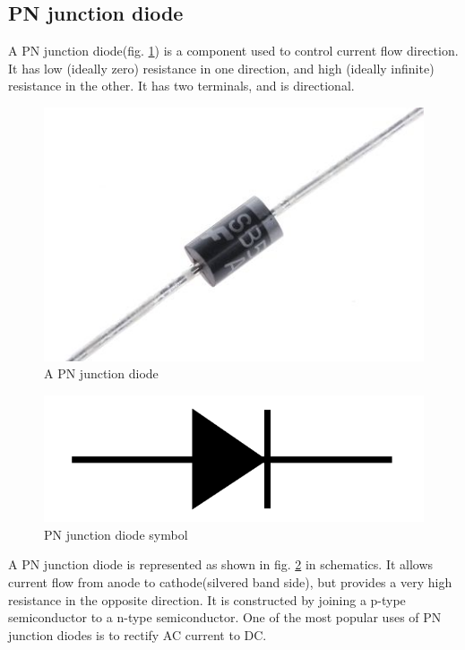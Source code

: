\documentclass{article}
\begin{document}
\subsection{PN junction diode}
A PN junction diode(fig. \ref{fig:diode}) is a component used to control current flow direction. It has low (ideally zero) resistance in one direction, and high (ideally infinite) resistance in the other. It has two terminals, and is directional. \\
\begin{figure}[h!]
	\centering
	\includegraphics[width=0.6\linewidth]{diode}
	\caption{A PN junction diode}
	\label{fig:diode}
\end{figure}
\begin{figure}[h]
	\centering
	\includegraphics[width=0.1\linewidth]{diode_symbol}
	\caption{PN junction diode symbol}
	\label{fig:diodesymbol}
\end{figure}
A PN junction diode is represented as shown in fig. \ref{fig:diodesymbol} in schematics. It allows current flow from anode to cathode(silvered band side), but provides a very high resistance in the opposite direction. It is constructed by joining a p-type semiconductor to a n-type semiconductor. One of the most popular uses of PN junction diodes is to rectify AC current to DC.
\end{document}
